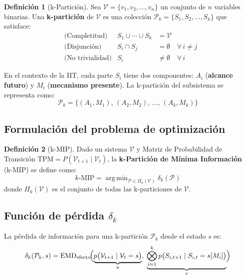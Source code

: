 \documentclass[12pt,letterpaper]{article}
\theoremstyle{definition}
\newtheorem{definition}{Definición}[section]
\theoremstyle{remark}
\DeclareMathOperator*{\argmin}{arg\,min}
\newcommand{\V}{\mathcal{V}}
\newcommand{\Part}{\mathcal{P}}
\newcommand{\EMD}{\operatorname{EMD}}
\newcommand{\kMIP}{k\text{-MIP}}
\begin{document}
\begin{definition}[k-Partición]
Sea $\V = \{v_1, v_2, \ldots, v_n\}$ un conjunto de $n$ variables binarias. Una
\textbf{k-partición} de $\V$ es una colección $\Part_k = \{S_1, S_2, \ldots, S_k\}$ que
satisface:
\begin{align}
  &\text{(Completitud)}    & S_1 \cup \cdots \cup S_k &= \V \label{eq:completitud}\\
  &\text{(Disjunción)}     & S_i \cap S_j &= \emptyset \quad \forall\, i \neq j
                                                        \label{eq:disjuncion}\\
  &\text{(No trivialidad)} & S_i &\neq \emptyset \quad \forall\, i \label{eq:notrivial}
\end{align}
\end{definition}

En el contexto de la IIT, cada parte $S_i$ tiene dos componentes:
$A_i$ (\textbf{alcance futuro}) y $M_i$ (\textbf{mecanismo presente}).
La k-partición del subsistema se representa como:
\begin{equation}
  \Part_k = \bigl\{ (A_1, M_1),\, (A_2, M_2),\, \ldots,\, (A_k, M_k) \bigr\}
  \label{eq:kpart-subsistema}
\end{equation}

\subsection{Formulación del problema de optimización}

\begin{definition}[k-MIP]
Dado un sistema $\V$ y Matriz de Probabilidad de Transición
$\mathrm{TPM} = P(\V_{t+1} \mid \V_t)$, la
\textbf{k-Partición de Mínima Información} (k-MIP) se define como:
\begin{equation}
  \kMIP = \argmin_{\Part \in \Pi_k(\V)} \delta_k(\Part)
  \label{eq:kmip}
\end{equation}
donde $\Pi_k(\V)$ es el conjunto de todas las k-particiones de $\V$.
\end{definition}

\subsection{Función de pérdida \texorpdfstring{$\delta_k$}{delta\_k}}

La pérdida de información para una k-partición $\Part_k$ desde el estado $s$ es:
\begin{equation}
  \delta_k(\Part_k, s) = \EMD_{\mathrm{efecto}}\!\Bigl(
    \underbrace{p\bigl(\V_{t+1} \mid \V_t = s\bigr)}_{u},\;
    \underbrace{\bigotimes_{i=1}^{k} p\bigl(S_{i,t+1} \mid S_{i,t} = s[M_i]\bigr)}_{v}
  \Bigr)
  \label{eq:delta_k}
\end{equation}
\end{document}
